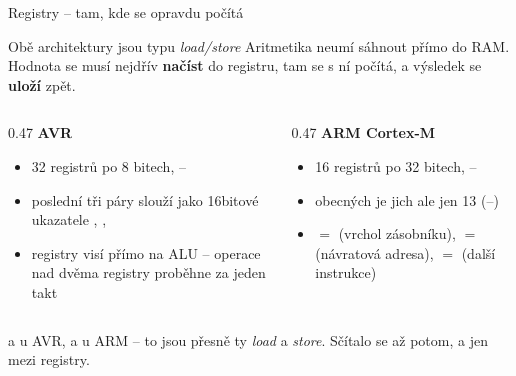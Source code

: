\documentclass[12pt,aspectratio=169]{beamer}
\begin{document}
\begin{frame}{Registry -- tam, kde se opravdu počítá}
  \begin{block}{Obě architektury jsou typu \textit{load/store}}
    \footnotesize
    Aritmetika neumí sáhnout přímo do RAM. Hodnota se musí nejdřív \textbf{načíst}
    do registru, tam se s ní počítá, a výsledek se \textbf{uloží} zpět.
  \end{block}
  \vspace{1mm}
  \begin{columns}[T]
    \begin{column}{0.47\textwidth}
      \footnotesize \textbf{AVR}
      \begin{itemize}
        \scriptsize
        \item 32 registrů po 8 bitech, --
        \item poslední tři páry slouží jako 16bitové ukazatele
              , , 
        \item registry visí přímo na ALU -- operace nad dvěma registry
              proběhne za jeden takt
      \end{itemize}
    \end{column}
    \begin{column}{0.47\textwidth}
      \footnotesize \textbf{ARM Cortex-M}
      \begin{itemize}
        \scriptsize
        \item 16 registrů po 32 bitech, --
        \item obecných je jich ale jen 13 (--)
        \item {} $=$  (vrchol zásobníku),
               $=$  (návratová adresa),
               $=$  (další instrukce)
      \end{itemize}
    \end{column}
  \end{columns}
  \vspace{1mm}
  \footnotesize
    a  u AVR,
   a  u ARM -- to jsou přesně ty \textit{load} a \textit{store}.
  Sčítalo se až potom, a jen mezi registry.
\end{frame}
\end{document}
